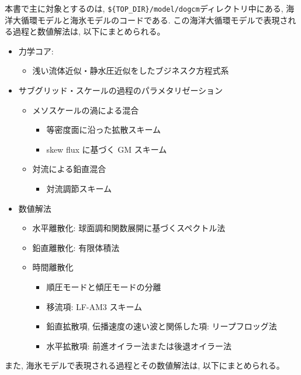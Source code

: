 本書で主に対象とするのは, \verb|${TOP_DIR}/model/dogcm|ディレクトリ中にある, 海洋大循環モデルと海氷モデルのコードである. 
この海洋大循環モデルで表現される過程と数値解法は, 以下にまとめられる。
\begin{itemize}
  \item 力学コア: 
  \begin{itemize}
    \item 浅い流体近似・静水圧近似をしたブジネスク方程式系
  \end{itemize}
  \item サブグリッド・スケールの過程のパラメタリゼーション
    \begin{itemize}
      \item メソスケールの渦による混合
      \begin{itemize}  
        \item 等密度面に沿った拡散スキーム \citep{redi1982oceanic} 
        \item skew flux に基づく GM スキーム \citep{gent1990isopycnal,griffies1998gent}
      \end{itemize} 
      \item 対流による鉛直混合
      \begin{itemize}  
        \item 対流調節スキーム \citep{marotzke1991influence,rahmstorf1993fast}
      \end{itemize}   
    \end{itemize} 
  \item 数値解法
  \begin{itemize}
    \item 水平離散化: 球面調和関数展開に基づくスペクトル法
    \item 鉛直離散化: 有限体積法
    \item 時間離散化
    \begin{itemize}
      \item 順圧モードと傾圧モードの分離　\citep{shchepetkin2005regional}
      \item 移流項: LF-AM3 スキーム \citep{shchepetkin2005regional}
  	  \item 鉛直拡散項, 伝播速度の速い波と関係した項: リープフロッグ法
  	  \item 水平拡散項: 前進オイラー法または後退オイラー法
    \end{itemize}                  
  \end{itemize}
\end{itemize}
また, 海氷モデルで表現される過程とその数値解法は, 以下にまとめられる。
